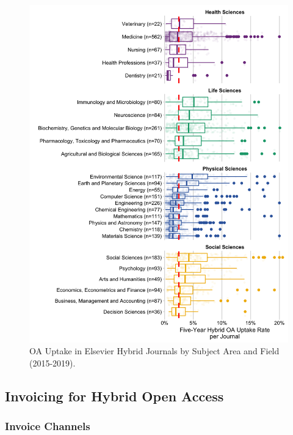 \documentclass[a4paper,man,floatsintext,longtable,noextraspace,12pt]{apa6}
\begin{document}
\begin{figure}[H]

{\centering \includegraphics[width=0.9\linewidth,]{manuscript_files/figure-latex/oa_sub_uptake-1} 

}

\caption{OA Uptake in Elsevier Hybrid Journals by Subject Area and Field (2015-2019).}\label{fig:oa_sub_uptake}
\end{figure}

\hypertarget{invoicing-for-hybrid-open-access}{%
\subsection*{Invoicing for Hybrid Open
Access}\label{invoicing-for-hybrid-open-access}}

\hypertarget{invoice-channels}{%
\subsubsection*{Invoice Channels}\label{invoice-channels}}
\end{document}
